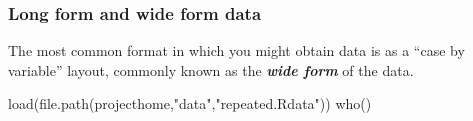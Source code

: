\documentclass[
]{book}
\newenvironment{Shaded}{\begin{snugshade}}{\end{snugshade}}
\newcommand{\FunctionTok}[1]{\textcolor[rgb]{0.00,0.00,0.00}{#1}}
\newcommand{\NormalTok}[1]{#1}
\newcommand{\StringTok}[1]{\textcolor[rgb]{0.31,0.60,0.02}{#1}}
\begin{document}
\hypertarget{long-form-and-wide-form-data}{%
\subsubsection{Long form and wide form data}\label{long-form-and-wide-form-data}}

The most common format in which you might obtain data is as a ``case by variable'' layout, commonly known as the \textbf{\emph{wide form}} of the data.

\begin{Shaded}
\begin{Highlighting}[]
\FunctionTok{load}\NormalTok{(}\FunctionTok{file.path}\NormalTok{(projecthome,}\StringTok{"data"}\NormalTok{,}\StringTok{"repeated.Rdata"}\NormalTok{))}
\FunctionTok{who}\NormalTok{()}
\end{Highlighting}
\end{Shaded}
\end{document}
